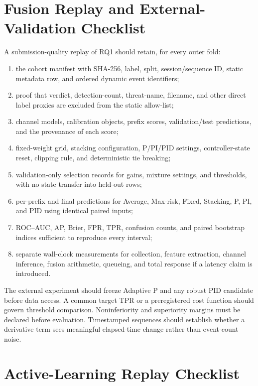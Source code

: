 \section{Fusion Replay and External-Validation Checklist}
\label{app:fusion}

A submission-quality replay of RQ1 should retain, for every outer fold:

\begin{enumerate}
    \item the cohort manifest with SHA-256, label, split, session/sequence ID,
    static metadata row, and ordered dynamic event identifiers;
    \item proof that verdict, detection-count, threat-name, filename, and other
    direct label proxies are excluded from the static allow-list;
    \item channel models, calibration objects, prefix scores, validation/test
    predictions, and the provenance of each score;
    \item fixed-weight grid, stacking configuration, P/PI/PID settings,
    controller-state reset, clipping rule, and deterministic tie breaking;
    \item validation-only selection records for gains, mixture settings, and
    thresholds, with no state transfer into held-out rows;
    \item per-prefix and final predictions for Average, Max-risk, Fixed,
    Stacking, P, PI, and PID using identical paired inputs;
    \item ROC--AUC, AP, Brier, FPR, TPR, confusion counts, and paired bootstrap
    indices sufficient to reproduce every interval;
    \item separate wall-clock measurements for collection, feature extraction,
    channel inference, fusion arithmetic, queueing, and total response if a
    latency claim is introduced.
\end{enumerate}

The external experiment should freeze Adaptive P and any robust PID candidate
before data access. A common target TPR or a preregistered cost function should
govern threshold comparison. Noninferiority and superiority margins must be
declared before evaluation. Timestamped sequences should establish whether a
derivative term sees meaningful elapsed-time change rather than event-count
noise.

\section{Active-Learning Replay Checklist}
\label{app:al}

